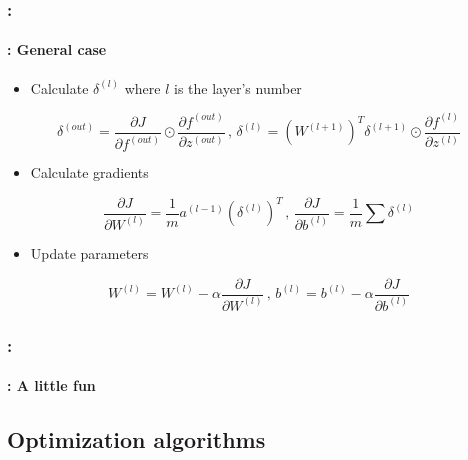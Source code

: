 \documentclass[xcolor=table]{beamer}
\begin{document}
\begin{frame}
	\frametitle{\insertshortsubtitle: \insertsection}
	\framesubtitle{\insertsubsection: General case}
	
	\begin{itemize}
		\item Calculate $\delta^{(l)}$ where $l$ is the layer's number
	\end{itemize}
	
	\[ 
	\delta^{(out)} = 
	\frac{\partial J}{\partial f^{(out)}} \odot \frac{\partial f^{(out)}}{\partial z^{(out)}}
	\,,\,
	\delta^{(l)} = \left(W^{(l+1)}\right)^T \delta^{(l+1)} \odot \frac{\partial f^{(l)}}{\partial z^{(l)}}
	\]
	
	\begin{itemize}
		\item Calculate gradients
	\end{itemize}
	
	\[ 
	\frac{\partial J}{\partial W^{(l)}} = \frac{1}{m} a^{(l-1)} (\delta^{(l)})^T
	\,,\,
	\frac{\partial J}{\partial b^{(l)}} = \frac{1}{m} \sum \delta^{(l)}
	\]
	
	\begin{itemize}
		\item Update parameters
	\end{itemize}
	
	\[ 
	W^{(l)} = W^{(l)} - \alpha \frac{\partial J}{\partial W^{(l)}}
	\,,\,
	b^{(l)} = b^{(l)} - \alpha \frac{\partial J}{\partial b^{(l)}}
	\]
	
	
\end{frame}

\begin{frame}
	\frametitle{\insertshortsubtitle: \insertsection}
	\framesubtitle{\insertsubsection: A little fun}
	
	\begin{center}
	\end{center}
	
\end{frame}

\subsection{Optimization algorithms}
\end{document}

